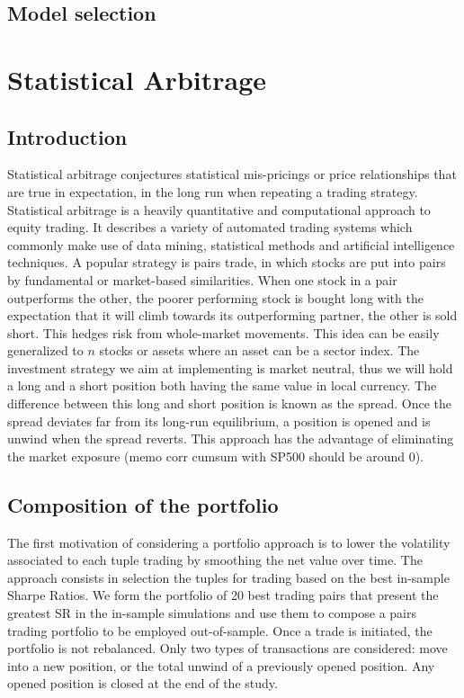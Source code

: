 \documentclass[11pt,a4,twosided,singlespacing,titlepagenumber=on]{scrreprt}
\numberwithin{equation}{chapter} %
\theoremstyle{remark}
\begin{document}
\section{Model selection}

\chapter{Statistical Arbitrage}
\section{Introduction}
Statistical arbitrage conjectures statistical mis-pricings or price relationships that are true in expectation, in the long run when repeating a trading strategy. Statistical arbitrage is a heavily quantitative and computational approach to equity trading. It describes a variety of automated trading systems which commonly make use of data mining, statistical methods and artificial intelligence techniques. A popular strategy is pairs trade, in which stocks are put into pairs by fundamental or market-based similarities. When one stock in a pair outperforms the other, the poorer performing stock is bought long with the expectation that it will climb towards its outperforming partner, the other is sold short. This hedges risk from whole-market movements. This idea can be easily generalized to $n$ stocks or assets where an asset can be a sector index. The investment strategy we aim at implementing is market neutral, thus we will hold a long and a short position both having the same value in local currency. The difference between this long and short position is known as the spread. Once the spread deviates far from its long-run equilibrium, a position is opened and is unwind when the spread reverts. This approach has the advantage of eliminating the market exposure (memo corr cumsum with SP500 should be around 0).

\section{Composition of the portfolio}
The first motivation of considering a portfolio approach is to lower the volatility associated to each tuple trading by smoothing the net value over time. The approach consists in selection the tuples for trading based on the best in-sample Sharpe Ratios. We form the portfolio of 20 best trading pairs that present the greatest SR in the in-sample simulations and use them to compose a pairs trading portfolio to be employed out-of-sample. Once a trade is initiated, the portfolio is not rebalanced. Only two types of transactions are considered: move into a new position, or the total unwind of a previously opened position. Any opened position is closed at the end of the study.
\end{document}
